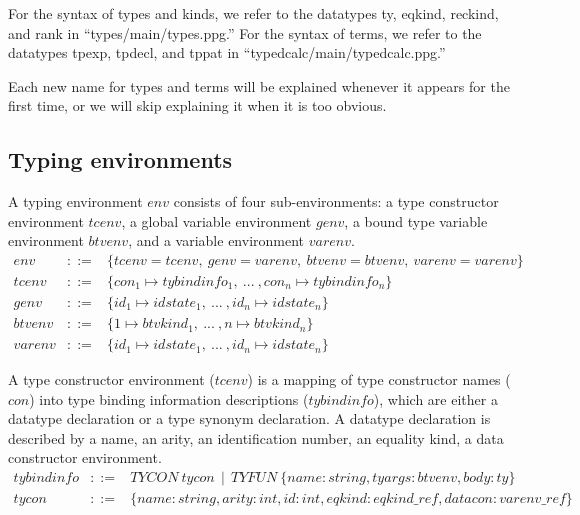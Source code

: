 \documentclass{article}
\newcommand{\env}    {env}
\newcommand{\tcenv}  {tcenv}
\newcommand{\genv}   {genv}
\newcommand{\btvenv} {btvenv}
\newcommand{\varenv} {varenv}
\newcommand{\ty}       {ty}
\begin{document}
For the syntax of types and kinds, we refer to the datatypes \ty,
eqkind, reckind, and rank in ``types/main/types.ppg.''  For the syntax
of terms, we refer to the datatypes tpexp, tpdecl, and tppat in
``typedcalc/main/typedcalc.ppg.''

Each new name for types and terms will be explained whenever it
appears for the first time, or we will skip explaining it when it is
too obvious.

\subsection{Typing environments}

A typing environment $\env$ consists of four sub-environments: a type
constructor environment $\tcenv$, a global variable environment
$\genv$, a bound type variable environment $\btvenv$, and a variable
environment $\varenv$.
\begin{eqnarray*}
\env & ::= & \{tcenv=\tcenv, \ genv=\varenv, \ btvenv=\btvenv, \ varenv=\varenv\}
\\
\tcenv & ::= & \{con_1\mapsto tybindinfo_1, \ ... \ , con_n\mapsto tybindinfo_n\}
\\
\genv & ::= & \{id_1\mapsto idstate_1, \ ... \ , id_n\mapsto idstate_n\}
\\
\btvenv & ::= & \{1\mapsto btvkind_1, \ ... \ , n\mapsto btvkind_n\}
\\
\varenv & ::= & \{id_1\mapsto idstate_1, \ ... \ , id_n\mapsto idstate_n\}
\end{eqnarray*}

A type constructor environment ($\tcenv$) is a mapping of type
constructor names ($con$) into type binding information descriptions
($tybindinfo$), which are either a datatype declaration
or a type synonym declaration. A datatype declaration is described by
a name, an arity, an identification number, an equality kind, a data
constructor environment. 
\begin{eqnarray*}
tybindinfo & ::= & TYCON \ tycon \ \ | \ \ TYFUN \ \{name:string, 
tyargs:\btvenv, body:ty\}
\\
tycon & ::= & \{ name:string, arity:int, id:int, eqkind:eqkind\_ref, datacon:varenv\_ref\}
\end{eqnarray*}
\end{document}
